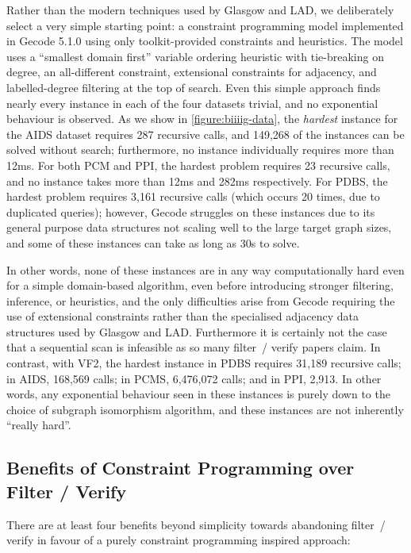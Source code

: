 \documentclass[twoside,11pt]{article}
\begin{document}
Rather than the modern techniques used by Glasgow and LAD, we deliberately select a very simple
starting point: a constraint programming model implemented in Gecode 5.1.0 using only
toolkit-provided constraints and heuristics. The model uses a ``smallest domain first'' variable
ordering heuristic with tie-breaking on degree, an all-different constraint, extensional constraints
for adjacency, and labelled-degree filtering at the top of search. Even this simple approach finds
nearly every instance in each of the four datasets trivial, and no exponential behaviour is
observed. As we show in \cref{figure:biiiig-data}, the \emph{hardest} instance for the AIDS dataset
requires 287 recursive calls, and 149,268 of the instances can be solved without search;
furthermore, no instance individually requires more than 12ms. For both PCM and PPI, the hardest
problem requires 23 recursive calls, and no instance takes more than 12ms and 282ms respectively.
For PDBS, the hardest problem requires 3,161 recursive calls (which occurs 20 times, due to
duplicated queries); however, Gecode struggles on these instances due to its general purpose data
structures not scaling well to the large target graph sizes, and some of these instances can take as
long as 30s to solve.

In other words, none of these instances are in any way computationally hard even for a simple
domain-based algorithm, even before introducing stronger filtering, inference, or heuristics, and
the only difficulties arise from Gecode requiring the use of extensional constraints rather than the
specialised adjacency data structures used by Glasgow and LAD.  Furthermore it is certainly not the
case that a sequential scan is infeasible as so many filter~/ verify papers claim.  In contrast,
with VF2, the hardest instance in PDBS requires 31,189 recursive calls; in AIDS, 168,569 calls; in
PCMS, 6,476,072 calls; and in PPI, 2,913. In other words, any exponential behaviour seen in these
instances is purely down to the choice of subgraph isomorphism algorithm, and these instances are
not inherently ``really hard''.

\subsection{Benefits of Constraint Programming over Filter / Verify}

There are at least four benefits beyond simplicity towards abandoning filter~/ verify in favour of a
purely constraint programming inspired approach:
\end{document}
